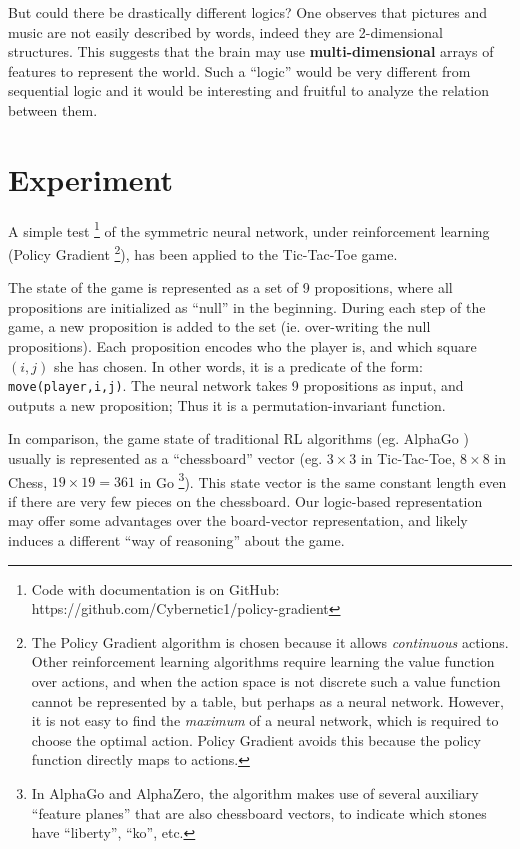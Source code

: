 \documentclass[orivec]{llncs}
\begin{document}
But could there be drastically different logics?  One observes that pictures and music are not easily described by words, indeed they are 2-dimensional structures.  This suggests that the brain may use \textbf{multi-dimensional} arrays of features to represent the world.  Such a ``logic'' would be very different from sequential logic and it would be interesting and fruitful to analyze the relation between them.

\section{Experiment}
\label{sec:experiment}

A simple test \footnote{ Code with documentation is on GitHub: https://github.com/Cybernetic1/policy-gradient } of the symmetric neural network, under reinforcement learning (Policy Gradient \footnote{The Policy Gradient algorithm is chosen because it allows \textit{continuous} actions.  Other reinforcement learning algorithms require learning the value function over actions, and when the action space is not discrete such a value function cannot be represented by a table, but perhaps as a neural network.  However, it is not easy to find the \textit{maximum} of a neural network, which is required to choose the optimal action.  Policy Gradient avoids this because the policy function directly maps to actions.}), has been applied to the Tic-Tac-Toe game.

The state of the game is represented as a set of 9 propositions, where all propositions are initialized as ``null'' in the beginning.  During each step of the game, a new proposition is added to the set (ie. over-writing the null propositions).  Each proposition encodes who the player is, and which square $(i,j)$ she has chosen.  In other words, it is a predicate of the form: \texttt{move(player,i,j)}.  The neural network takes 9 propositions as input, and outputs a new proposition;  Thus it is a permutation-invariant function.

In comparison, the game state of traditional RL algorithms (eg. AlphaGo \cite{Silver2016} \cite{Silver2017} \cite{Pumperla2019}) usually is represented as a ``chessboard'' vector (eg. $3 \times 3$ in Tic-Tac-Toe, $8 \times 8$ in Chess, $19 \times 19 = 361$ in Go \footnote{In AlphaGo and AlphaZero, the algorithm makes use of several auxiliary ``feature planes'' that are also chessboard vectors, to indicate which stones have ``liberty'', ``ko'', etc.}).  This state vector is the same constant length even if there are very few pieces on the chessboard.  Our logic-based representation may offer some advantages over the board-vector representation, and likely induces a different ``way of reasoning'' about the game.
\end{document}
